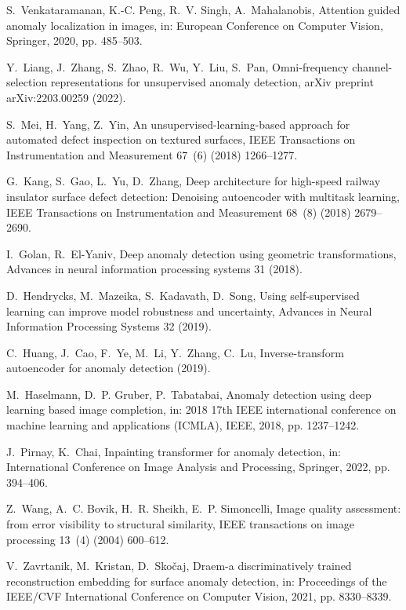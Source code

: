 \documentclass[5p, twocolumn]{elsarticle}[draft]
\begin{document}
\begin{thebibliography}{10}
S.~Venkataramanan, K.-C. Peng, R.~V. Singh, A.~Mahalanobis, Attention guided
  anomaly localization in images, in: European Conference on Computer Vision,
  Springer, 2020, pp. 485--503.

Y.~Liang, J.~Zhang, S.~Zhao, R.~Wu, Y.~Liu, S.~Pan, Omni-frequency
  channel-selection representations for unsupervised anomaly detection, arXiv
  preprint arXiv:2203.00259 (2022).

S.~Mei, H.~Yang, Z.~Yin, An unsupervised-learning-based approach for automated
  defect inspection on textured surfaces, IEEE Transactions on Instrumentation
  and Measurement 67~(6) (2018) 1266--1277.

G.~Kang, S.~Gao, L.~Yu, D.~Zhang, Deep architecture for high-speed railway
  insulator surface defect detection: Denoising autoencoder with multitask
  learning, IEEE Transactions on Instrumentation and Measurement 68~(8) (2018)
  2679--2690.

I.~Golan, R.~El-Yaniv, Deep anomaly detection using geometric transformations,
  Advances in neural information processing systems 31 (2018).

D.~Hendrycks, M.~Mazeika, S.~Kadavath, D.~Song, Using self-supervised learning
  can improve model robustness and uncertainty, Advances in Neural Information
  Processing Systems 32 (2019).

C.~Huang, J.~Cao, F.~Ye, M.~Li, Y.~Zhang, C.~Lu, Inverse-transform autoencoder
  for anomaly detection (2019).

M.~Haselmann, D.~P. Gruber, P.~Tabatabai, Anomaly detection using deep learning
  based image completion, in: 2018 17th IEEE international conference on
  machine learning and applications (ICMLA), IEEE, 2018, pp. 1237--1242.

J.~Pirnay, K.~Chai, Inpainting transformer for anomaly detection, in:
  International Conference on Image Analysis and Processing, Springer, 2022,
  pp. 394--406.

Z.~Wang, A.~C. Bovik, H.~R. Sheikh, E.~P. Simoncelli, Image quality assessment:
  from error visibility to structural similarity, IEEE transactions on image
  processing 13~(4) (2004) 600--612.

V.~Zavrtanik, M.~Kristan, D.~Sko{\v{c}}aj, Draem-a discriminatively trained
  reconstruction embedding for surface anomaly detection, in: Proceedings of
  the IEEE/CVF International Conference on Computer Vision, 2021, pp.
  8330--8339.


\end{thebibliography}
\end{document}
